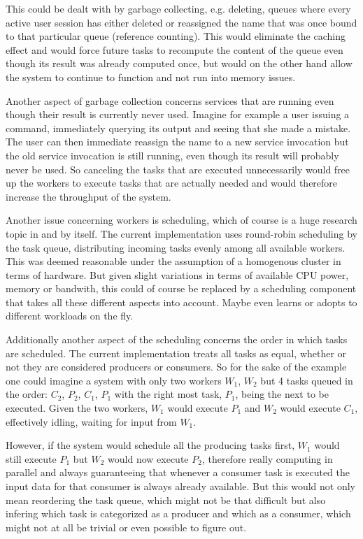 This could be dealt with by garbage collecting, e.g. deleting,
queues where every active user session has either deleted or reassigned
the name that was once bound to that particular queue (reference counting).
This would eliminate the caching effect and would force future tasks
to recompute the content of the queue even though its result
was already computed once, but would on the other hand allow the system
to continue to function and not run into memory issues.

Another aspect of garbage collection concerns services that
are running even though their result is currently never used.
Imagine for example a user issuing a command, immediately querying
its output and seeing that she made a mistake. The user can then
immediate reassign the name to a new service invocation but the
old service invocation is still running, even though its result
will probably never be used. So canceling the tasks that are
executed unnecessarily would free up the workers to execute tasks
that are actually needed and would therefore increase the throughput
of the system.
\newline

Another issue concerning workers is scheduling, which of course
is a huge research topic in and by itself. The current implementation
uses round-robin scheduling by the task queue, distributing incoming
tasks evenly among all available workers. This was deemed
reasonable under the assumption of a homogenous cluster in terms
of hardware. But given slight variations in terms of available
CPU power, memory or bandwith, this could of course be
replaced by a scheduling component that takes all these different
aspects into account. Maybe even learns or adopts to different
workloads on the fly.

Additionally another aspect of the scheduling concerns the
order in which tasks are scheduled. The current implementation
treats all tasks as equal, whether or not they are considered
producers or consumers. So for the sake of the example one could
imagine a system with only two workers $W_{1}$, $W_{2}$ but
4 tasks queued in the order: $C_{2}$, $P_{2}$, $C_{1}$, $P_{1}$
with the right most task, $P_{1}$, being the next to be executed.
Given the two workers, $W_{1}$ would execute $P_{1}$ and $W_{2}$
would execute $C_{1}$, effectively idling, waiting for input
from $W_{1}$.

However, if the system would schedule all the producing
tasks first, $W_{1}$ would still execute $P_{1}$ but $W_{2}$
would now execute $P_{2}$, therefore really computing in parallel
and always guaranteeing that whenever a consumer task is executed
the input data for that consumer is always already available.
But this would not only mean reordering the task queue, which
might not be that difficult but also infering which task is
categorized as a producer and which as a consumer, which might
not at all be trivial or even possible to figure out.
\newline

